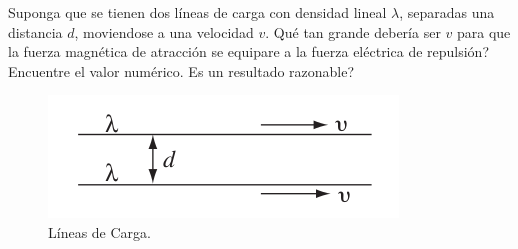 \begin{mdframed}[style=warning]
	\begin{ejercicio}
		Suponga que se tienen dos líneas de carga con densidad lineal $\lambda$, separadas una distancia $d$, moviendose a una velocidad $v$. Qué tan grande debería ser $v$ para que la fuerza magnética de atracción se equipare a la fuerza eléctrica de repulsión? Encuentre el valor numérico. Es un resultado razonable?
		\begin{figure}[H]
			\centering
			\includegraphics[scale=0.5]{./img/p2.png}
			\caption{Líneas de Carga.}
			\label{DF}	
		\end{figure}
	\end{ejercicio}
\end{mdframed}
























